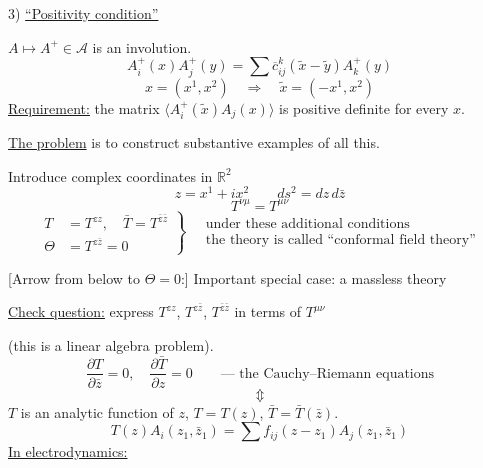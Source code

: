 3) \underline{``Positivity condition''}

$A\mapsto A^+\in\mathcal A$ is an involution.
\begin{equation*}
A_i^+(x)A_j^+(y)=\sum\overline{c}_{ij}^k(\widetilde x-\widetilde y)A_k^+(y)
\tag{8}
\end{equation*}
\begin{equation*}
x=(x^1,x^2)\quad\Rightarrow\quad\widetilde x=(-x^1,x^2)
\end{equation*}
\underline{Requirement:} the matrix $\langle A_i^+(\widetilde x)A_j(x)\rangle$
is positive definite for every $x$.

\underline{The problem} is to construct substantive examples of all this.

Introduce complex coordinates in $\mathbb R^2$
\begin{equation*}
z=x^1+ix^2\qquad ds^2=dz\,d\bar z
\end{equation*}
\begin{equation*}
T^{\nu\mu}=T^{\mu\nu}
\tag{9}
\end{equation*}
\begin{equation*}
\left.\begin{aligned}
T&=T^{zz},\quad\bar T=T^{\bar z\bar z}\\
\Theta&=T^{z\bar z}=0
\end{aligned}\right\}
\quad\begin{gathered}
\text{under these additional conditions}\\
\text{the theory is called ``conformal field theory''}
\end{gathered}
\tag{10}
\end{equation*}

[Arrow from below to $\Theta=0$:] Important special case: a massless theory

\underline{Check question:} express $T^{zz}$, $T^{z\bar z}$, $T^{\bar z\bar z}$ in terms of $T^{\mu\nu}$

(this is a linear algebra problem).
\begin{equation*}
\frac{\partial T}{\partial\bar z}=0,\quad
\frac{\partial\bar T}{\partial z}=0
\qquad\text{--- the Cauchy--Riemann equations}
\tag{11}
\end{equation*}
\begin{equation*}
\Updownarrow
\end{equation*}
$T$ is an analytic function of $z$, $T=T(z)$, $\bar T=\bar T(\bar z)$.
\begin{equation*}
T(z)A_i(z_1,\bar z_1)=\sum f_{ij}(z-z_1)A_j(z_1,\bar z_1)
\tag{12}
\end{equation*}
\underline{In electrodynamics:}

